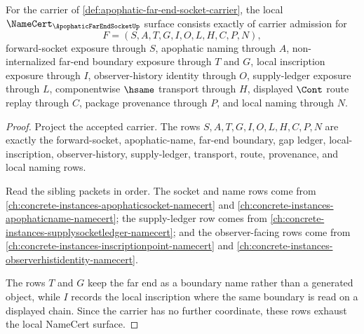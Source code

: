 \begin{theorem}
\label{thm:apophatic-far-end-socket-namecert-obligations}
For the carrier of \autoref{def:apophatic-far-end-socket-carrier}, the local $\NameCert_{\ApophaticFarEndSocketUp}$ surface consists exactly of carrier admission for
$$
F=(S,A,T,G,I,O,L,H,C,P,N),
$$
forward-socket exposure through $S$, apophatic naming through $A$, non-internalized far-end boundary exposure through $T$ and $G$, local inscription exposure through $I$, observer-history identity through $O$, supply-ledger exposure through $L$, componentwise $\hsame$ transport through $H$, displayed $\Cont$ route replay through $C$, package provenance through $P$, and local naming through $N$.
\end{theorem}
\begin{proof}
Project the accepted carrier. The rows $S,A,T,G,I,O,L,H,C,P,N$ are exactly the forward-socket, apophatic-name, far-end boundary, gap ledger, local-inscription, observer-history, supply-ledger, transport, route, provenance, and local naming rows.

Read the sibling packets in order. The socket and name rows come from \autoref{ch:concrete-instances-apophaticsocket-namecert} and \autoref{ch:concrete-instances-apophaticname-namecert}; the supply-ledger row comes from \autoref{ch:concrete-instances-supplysocketledger-namecert}; and the observer-facing rows come from \autoref{ch:concrete-instances-inscriptionpoint-namecert} and \autoref{ch:concrete-instances-observerhistidentity-namecert}.

The rows $T$ and $G$ keep the far end as a boundary name rather than a generated object, while $I$ records the local inscription where the same boundary is read on a displayed chain. Since the carrier has no further coordinate, these rows exhaust the local NameCert surface.
\end{proof}

